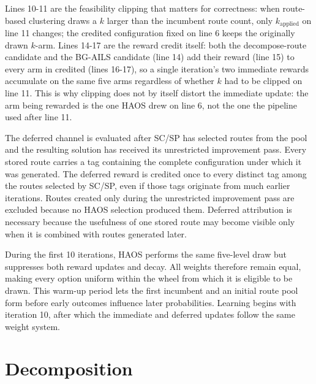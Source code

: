 Lines 10-11 are the feasibility clipping that matters for correctness: when route-based clustering draws a $k$ larger than the incumbent route count, only $k_{\mathrm{applied}}$ on line 11 changes; the credited configuration fixed on line 6 keeps the originally drawn $k$-arm. Lines 14-17 are the reward credit itself: both the decompose-route candidate and the BG-AILS candidate (line 14) add their reward (line 15) to every arm in credited (lines 16-17), so a single iteration's two immediate rewards accumulate on the same five arms regardless of whether $k$ had to be clipped on line 11. This is why clipping does not by itself distort the immediate update: the arm being rewarded is the one HAOS drew on line 6, not the one the pipeline used after line 11.

The deferred channel is evaluated after SC/SP has selected routes from the pool and the resulting solution has received its unrestricted improvement pass. Every stored route carries a tag containing the complete configuration under which it was generated. The deferred reward is credited once to every distinct tag among the routes selected by SC/SP, even if those tags originate from much earlier iterations. Routes created only during the unrestricted improvement pass are excluded because no HAOS selection produced them. Deferred attribution is necessary because the usefulness of one stored route may become visible only when it is combined with routes generated later.

During the first 10 iterations, HAOS performs the same five-level draw but suppresses both reward updates and decay. All weights therefore remain equal, making every option uniform within the wheel from which it is eligible to be drawn. This warm-up period lets the first incumbent and an initial route pool form before early outcomes influence later probabilities. Learning begins with iteration 10, after which the immediate and deferred updates follow the same weight system.

\section{Decomposition}\label{sec:fra-decomposition}


